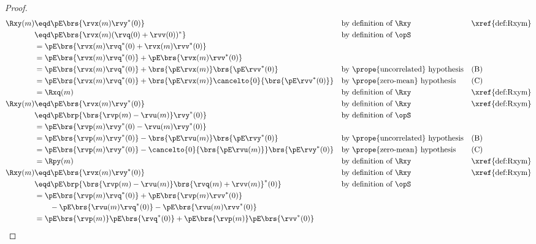 \begin{proof}
\begin{align*}
  \Rxy(m)
    &\eqd \pE\brs{\rvx(m)\rvy^\ast(0)}
    && \text{by definition of $\Rxy$}
    && \text{\xref{def:Rxym}}
  \\&\eqd \pE\brs{\rvx(m)(\rvq(0)+\rvv(0))^\ast}
    && \text{by definition of $\opS$}
  \\&= \pE\brs{\rvx(m)\rvq^\ast(0)+\rvx(m)\rvv^\ast(0)}
  \\&= \pE\brs{\rvx(m)\rvq^\ast(0)} + \pE\brs{\rvx(m)\rvv^\ast(0)}
  \\&= \pE\brs{\rvx(m)\rvq^\ast(0)} + \brs{\pE\rvx(m)}\brs{\pE\rvv^\ast(0)}
    && \text{by \prope{uncorrelated} hypothesis}
    && \text{(B)}
  \\&= \pE\brs{\rvx(m)\rvq^\ast(0)} + \brs{\pE\rvx(m)}\cancelto{0}{\brs{\pE\rvv^\ast(0)}}
    && \text{by \prope{zero-mean} hypothesis}
    && \text{(C)}
  \\&= \Rxq(m)
    && \text{by definition of $\Rxy$}
    && \text{\xref{def:Rxym}}
  \\
  \Rxy(m)
    &\eqd \pE\brs{\rvx(m)\rvy^\ast(0)}
    && \text{by definition of $\Rxy$}
    && \text{\xref{def:Rxym}}
  \\&\eqd \pE\brp{\brs{\rvp(m)-\rvu(m)}\rvy^\ast(0)}
    && \text{by definition of $\opS$}
  \\&= \pE\brs{\rvp(m)\rvy^\ast(0)-\rvu(m)\rvy^\ast(0)}
  \\&= \pE\brs{\rvp(m)\rvy^\ast(0)} - \brs{\pE\rvu(m)}\brs{\pE\rvy^\ast(0)}
    && \text{by \prope{uncorrelated} hypothesis}
    && \text{(B)}
  \\&= \pE\brs{\rvp(m)\rvy^\ast(0)} - \cancelto{0}{\brs{\pE\rvu(m)}}\brs{\pE\rvy^\ast(0)}
    && \text{by \prope{zero-mean} hypothesis}
    && \text{(C)}
  \\&= \Rpy(m)
    && \text{by definition of $\Rxy$}
    && \text{\xref{def:Rxym}}
  \\
  \Rxy(m)
    &\eqd \pE\brs{\rvx(m)\rvy^\ast(0)}
    && \text{by definition of $\Rxy$}
    && \text{\xref{def:Rxym}}
  \\&\eqd \pE\brp{\brs{\rvp(m)-\rvu(m)}\brs{\rvq(m)+\rvv(m)}^\ast(0)}
    && \text{by definition of $\opS$}
  \\&= \pE\brs{\rvp(m)\rvq^\ast(0)}
     + \pE\brs{\rvp(m)\rvv^\ast(0)}
     \\&\qquad
     - \pE\brs{\rvu(m)\rvq^\ast(0)}
     - \pE\brs{\rvu(m)\rvv^\ast(0)}
  \\&= \pE\brs{\rvp(m)}\pE\brs{\rvq^\ast(0)}
     + \pE\brs{\rvp(m)}\pE\brs{\rvv^\ast(0)}

\end{align*}
\end{proof}
